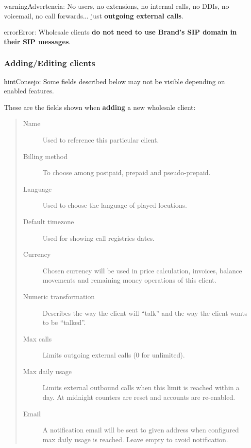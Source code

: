 \documentclass[letterpaper,10pt,spanish]{sphinxmanual}
\begin{document}
\begin{notice}{warning}{Advertencia:}
No users, no extensions, no internal calls, no DDIs, no voicemail, no call forwards...
just \textbf{outgoing external calls}.
\end{notice}

\begin{notice}{error}{Error:}
Wholesale clients \textbf{do not need to use Brand's SIP domain in their SIP messages}.
\end{notice}


\subsubsection{Adding/Editing clients}
\label{administration_portal/brand/clients/wholesale:adding-editing-clients}
\begin{notice}{hint}{Consejo:}
Some fields described below may not be visible depending on enabled features.
\end{notice}

These are the fields shown when \textbf{adding} a new wholesale client:
\begin{quote}
\begin{description}
\item[{Name}] \leavevmode
Used to reference this particular client.

\item[{Billing method}] \leavevmode
To choose among postpaid, prepaid and pseudo-prepaid.

\item[{Language}] \leavevmode
Used to choose the language of played locutions.

\item[{Default timezone}] \leavevmode
Used for showing call registries dates.

\item[{Currency}] \leavevmode
Chosen currency will be used in price calculation, invoices, balance movements and
remaining money operations of this client.

\item[{Numeric transformation}] \leavevmode
Describes the way the client will ``talk'' and the way the client wants to be ``talked''.

\item[{Max calls}] \leavevmode
Limits outgoing external calls (0 for unlimited).

\item[{Max daily usage}] \leavevmode
Limits external outbound calls when this limit is reached within a day. At midnight counters are reset and
accounts are re-enabled.

\item[{Email}] \leavevmode
A notification email will be sent to given address when configured max daily usage is reached. Leave empty to
avoid notification.

\end{description}
\end{quote}
\end{document}

